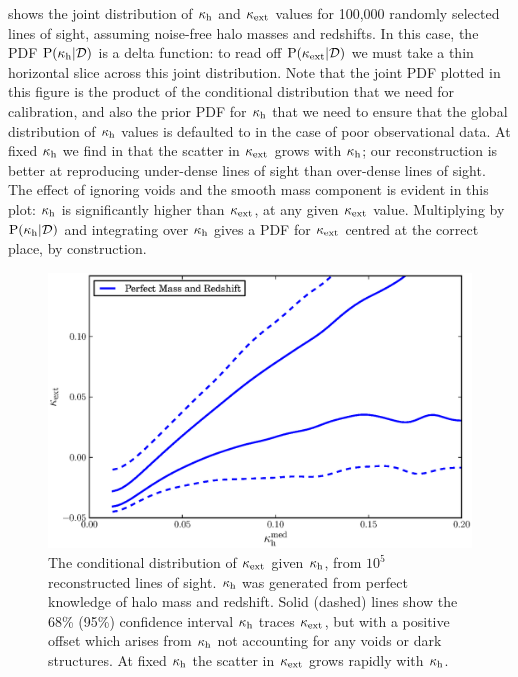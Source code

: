 \documentclass[useAMS,usenatbib,a4paper]{mn2e}
\begin{document}
 shows the joint distribution of $\kappa_{\rm h}$ and $\kappa_{\rm ext}$
values for 100,000 randomly selected \MS lines of sight, assuming noise-free
halo masses and redshifts. In this case, the PDF ${\rm P}(\kappa_{\rm h}|{\mathcal{D}})$ is a
delta function: to read off ${\rm P}(\kappa_{\rm ext}|{\mathcal{D}})$ we must take a thin horizontal
slice across this joint distribution. Note that the joint PDF plotted in this
figure is the product of  the conditional distribution that we need for
calibration, and also the prior PDF for $\kappa_{\rm h}$ that we need to ensure that
the global distribution of $\kappa_{\rm h}$ values is defaulted to in the case of
poor observational data. At fixed $\kappa_{\rm h}$ we find in 
that the scatter in $\kappa_{\rm ext}$ grows with $\kappa_{\rm h}$; our reconstruction is
better at reproducing under-dense lines of sight than over-dense lines of sight.
The effect of ignoring voids and the smooth mass component is evident in this
plot: $\kappa_{\rm h}$ is significantly higher than $\kappa_{\rm ext}$, at any given $\kappa_{\rm ext}$
value. Multiplying by ${\rm P}(\kappa_{\rm h}|{\mathcal{D}})$ and integrating over $\kappa_{\rm h}$
gives a PDF for $\kappa_{\rm ext}$ centred at the correct place, by construction.

\begin{figure}
\includegraphics[width=\columnwidth]{figs/cornerplot.eps}
\caption[Biased?]{The conditional distribution of 
$\kappa_{\rm ext}$ given $\kappa_{\rm h}$, from $10^5$ reconstructed lines of
sight. $\kappa_{\rm h}$ was generated from perfect knowledge of halo mass and redshift. Solid (dashed) lines show the 68\% (95\%) confidence interval $\kappa_{\rm h}$ traces $\kappa_{\rm ext}$, but with a positive offset which arises from
$\kappa_{\rm h}$ not accounting for any voids or dark structures.
 At fixed $\kappa_{\rm h}$ the scatter in $\kappa_{\rm ext}$ grows rapidly with $\kappa_{\rm h}$.}
\label{fig:jointkh-k}
\end{figure}
\end{document}
